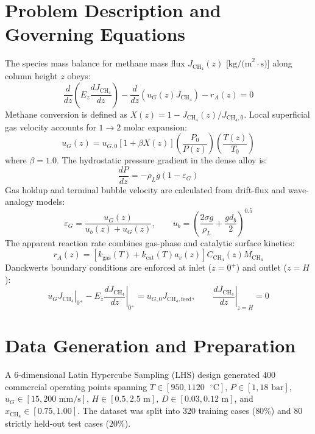 \documentclass[12pt,a4paper,oneside]{report}
\begin{document}
\section{Problem Description and Governing Equations}
The species mass balance for methane mass flux $J_{\text{CH}_4}(z)$ [$\text{kg/(m}^2\cdot\text{s)}$] along column height $z$ obeys:
\begin{equation}
\frac{d}{dz}\left( E_z \frac{dJ_{\text{CH}_4}}{dz} \right) - \frac{d}{dz}\left( u_G(z) J_{\text{CH}_4} \right) - r_A(z) = 0
\end{equation}
Methane conversion is defined as $X(z) = 1 - J_{\text{CH}_4}(z)/J_{\text{CH}_4,0}$. Local superficial gas velocity accounts for $1 \rightarrow 2$ molar expansion:
\begin{equation}
u_G(z) = u_{G,0} \left[1 + \beta X(z)\right] \left(\frac{P_0}{P(z)}\right) \left(\frac{T(z)}{T_0}\right)
\end{equation}
where $\beta = 1.0$. The hydrostatic pressure gradient in the dense alloy is:
\begin{equation}
\frac{dP}{dz} = -\rho_L g (1 - \varepsilon_G)
\end{equation}
Gas holdup and terminal bubble velocity are calculated from drift-flux and wave-analogy models:
\begin{equation}
\varepsilon_G = \frac{u_G(z)}{u_b(z) + u_G(z)}, \qquad u_b = \left( \frac{2\sigma g}{\rho_L} + \frac{g d_b}{2} \right)^{0.5}
\end{equation}
The apparent reaction rate combines gas-phase and catalytic surface kinetics:
\begin{equation}
r_A(z) = \left[ k_{\text{gas}}(T) + k_{\text{cat}}(T) a_v(z) \right] C_{\text{CH}_4}(z) M_{\text{CH}_4}
\end{equation}
Danckwerts boundary conditions are enforced at inlet ($z = 0^+$) and outlet ($z = H$):
\begin{equation}
\left. u_G J_{\text{CH}_4} \right|_{0^+} - \left. E_z \frac{dJ_{\text{CH}_4}}{dz}\right|_{0^+} = u_{G,0} J_{\text{CH}_4,\text{feed}}, \qquad \left. \frac{dJ_{\text{CH}_4}}{dz}\right|_{z = H} = 0
\end{equation}

\section{Data Generation and Preparation}
A 6-dimensional Latin Hypercube Sampling (LHS) design generated 400 commercial operating points spanning $T \in [950, 1120\text{ }^\circ\text{C}]$, $P \in [1, 18\text{ bar}]$, $u_G \in [15, 200\text{ mm/s}]$, $H \in [0.5, 2.5\text{ m}]$, $D \in [0.03, 0.12\text{ m}]$, and $x_{\text{CH}_4} \in [0.75, 1.00]$. The dataset was split into 320 training cases ($80\%$) and 80 strictly held-out test cases ($20\%$).
\end{document}
